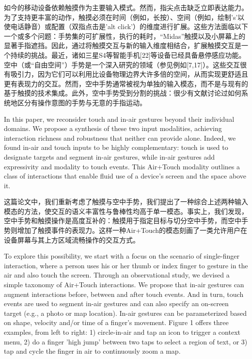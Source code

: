 如今的移动设备依赖触摸作为主要输入模式。然而，指尖点击缺乏立即表达能力。为了支持更丰富的动作，触摸必须在时间（例如，长按）、空间（例如，绘制's'以使电话静音）或配置（双指点击是'alt click'）的维度进行扩展。这些方法面临以下一个或多个问题：手势集的可扩展性，执行的耗时，“Midas”触摸以及小屏幕上的显著手指遮挡。因此，通过将触摸交互与新的输入维度相结合，扩展触摸交互是一个持续的挑战。最近，诸如三星S4等智能手机[22]等设备已经具备悬停感应功能。空中（或“自由空间”）手势是一个深入研究的领域（参见例如[7,17]）。这些交互很有吸引力，因为它们可以利用比设备物理边界大许多倍的空间，从而实现更舒适且更有表现力的交互。然而，空中手势通常被视为单独的输入模态，而不是与现有的基于触摸的技术集成。此外，空中手势受到分割的挑战：很少有文献讨论过如何系统地区分有操作意图的手势与无意的手指运动。

In this paper, we reconsider touch and in-air gestures beyond their individual domains. We propose a synthesis of these two input modalities, achieving interaction richness and robustness that neither can provide alone. Indeed, we found in-air and touch inputs to be highly complementary: touch is used to designate targets and segment in-air gestures, while in-air gestures add expressivity and modality to touch events. This Air+Touch modality outlines a class of interactions that enable fluid use of a device’s screen and the space above it.

这篇论文中，我们重新考虑了触摸与空中手势，我们提出了一种综合上述两种输入模态的方法，使交互的语义丰富性与鲁棒性均高于单一模态。事实上，我们发现，空中手势和触摸操作是高度互补的：触摸用于指定目标与切分空中手势，而空中手势则增加了触摸事件的表现力。这样一种Air+Touch的模态刻画了一类允许用户在设备屏幕与其上方区域流畅操作的交互方式。

To explore this possibility, we start with a focus on the scenario of single-finger interaction, where a person uses his or her thumb or index finger to gesture in the air and also touch the screen. Through an observational study, we devised a simple taxonomy of Air+Touch interactions. We propose that in-air gestures can augment interactions before, between and after touch events. And in turn, touch events are used to segment in-air gestures and can also specify an on-screen target (e.g., a photo or map location). In-air gestures can be parameterized based on shape, velocity and/or time of a finger’s movement. Figure 1 offers three examples, from left to right: 1) circle-in-air and tap an icon to trigger a context menu, 2) do a finger 'high jump' between two taps to select a region of text, or 3) tap and cycle the finger in air to continuously zoom a map. 

